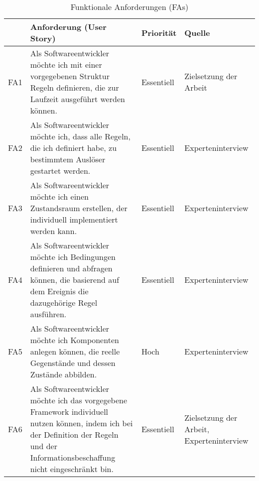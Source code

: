     \begin{table}[hbt!]
        \begin{center}
            \begin{tabular}{ | p{0.6cm} | p{9.5cm} | p{1.6cm} | p{3.1cm} | }
                \hline
                    \textbf{} & \textbf{Anforderung (User Story)} & \textbf{Priorität} & \textbf{Quelle} \\
                \hline
                    FA1 & Als Softwareentwickler möchte ich mit einer vorgegebenen Struktur Regeln definieren, die zur Laufzeit ausgeführt werden können. & Essentiell & Zielsetzung der Arbeit \\  %
                \hline
                    FA2 & Als Softwareentwickler möchte ich, dass alle Regeln, die ich definiert habe, zu bestimmtem Auslöser gestartet werden. & Essentiell & Experteninterview \\
                \hline
                    FA3 & Als Softwareentwickler möchte ich einen Zustandsraum erstellen, der individuell implementiert werden kann. & Essentiell & Experteninterview \\ 
                \hline
                    FA4 & Als Softwareentwickler möchte ich Bedingungen definieren und abfragen können, die basierend auf dem Ereignis die dazugehörige Regel ausführen. & Essentiell & Experteninterview \\ 
                \hline
                    FA5 & Als Softwareentwickler möchte ich Komponenten anlegen können, die reelle Gegenstände und dessen Zustände abbilden. & Hoch & Experteninterview \\
                \hline
                    FA6 & Als Softwareentwickler möchte ich das vorgegebene Framework individuell nutzen können, indem ich bei der Definition der Regeln und der Informationsbeschaffung nicht eingeschränkt bin. & Essentiell & Zielsetzung der Arbeit, Experteninterview \\
                \hline
            \end{tabular}
        \end{center}
        \caption{Funktionale Anforderungen (FAs)}
        \label{tab:functionalRequirements}
    \end{table}
   